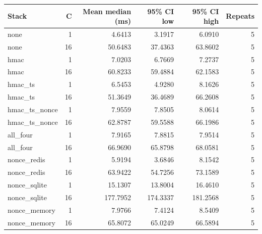 \begin{tabular}{lrrrrr}
\toprule
Stack & C & Mean median (ms) & 95\% CI low & 95\% CI high & Repeats \\
\midrule
none & 1 & 4.6413 & 3.1917 & 6.0910 & 5 \\
none & 16 & 50.6483 & 37.4363 & 63.8602 & 5 \\
hmac & 1 & 7.0203 & 6.7669 & 7.2737 & 5 \\
hmac & 16 & 60.8233 & 59.4884 & 62.1583 & 5 \\
hmac_ts & 1 & 6.5453 & 4.9280 & 8.1626 & 5 \\
hmac_ts & 16 & 51.3649 & 36.4689 & 66.2608 & 5 \\
hmac_ts_nonce & 1 & 7.9559 & 7.8505 & 8.0614 & 5 \\
hmac_ts_nonce & 16 & 62.8787 & 59.5588 & 66.1986 & 5 \\
all_four & 1 & 7.9165 & 7.8815 & 7.9514 & 5 \\
all_four & 16 & 66.9690 & 65.8798 & 68.0581 & 5 \\
nonce_redis & 1 & 5.9194 & 3.6846 & 8.1542 & 5 \\
nonce_redis & 16 & 63.9422 & 54.7256 & 73.1589 & 5 \\
nonce_sqlite & 1 & 15.1307 & 13.8004 & 16.4610 & 5 \\
nonce_sqlite & 16 & 177.7952 & 174.3337 & 181.2568 & 5 \\
nonce_memory & 1 & 7.9766 & 7.4124 & 8.5409 & 5 \\
nonce_memory & 16 & 65.8072 & 65.0249 & 66.5894 & 5 \\
\bottomrule
\end{tabular}
